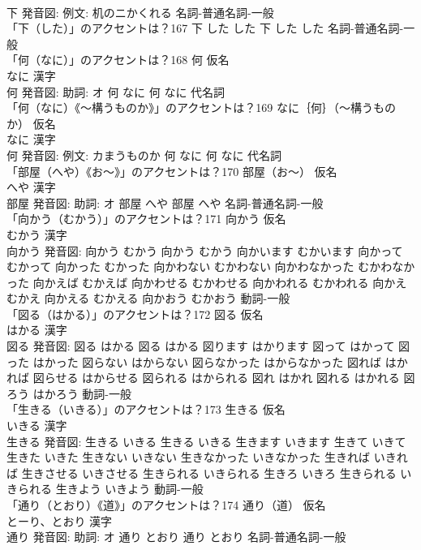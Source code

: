 \documentclass[8pt]{extreport}
\begin{document}
\begin{CJK}{UTF8}{min}
\\	下 発音図: 例文: 机のニかくれる							名詞-普通名詞-一般 
\\	「下（した）」のアクセントは？167		下 した した		下 した した				名詞-普通名詞-一般 
\\	「何（なに）」のアクセントは？168	何 仮名　
\\	なに 漢字　
\\	何 発音図: 助詞: オ	何 なに		何 なに				代名詞 
\\	「何（なに）《〜構うものか》」のアクセントは？169	なに｛何｝（〜構うものか） 仮名　
\\	なに 漢字　
\\	何 発音図: 例文: カまうものか	何 なに		何 なに				代名詞 
\\	「部屋（へや）《お〜》」のアクセントは？170	部屋（お〜） 仮名　
\\	へや 漢字　
\\	部屋 発音図: 助詞: オ	部屋 へや		部屋 へや				名詞-普通名詞-一般 
\\	「向かう（むかう）」のアクセントは？171	向かう 仮名　
\\	むかう 漢字　
\\	向かう 発音図:	向かう むかう		向かう むかう 向かいます むかいます 向かって むかって 向かった むかった 向かわない むかわない 向かわなかった むかわなかった 向かえば むかえば 向かわせる むかわせる 向かわれる むかわれる 向かえ むかえ 向かえる むかえる 向かおう むかおう				動詞-一般 
\\	「図る（はかる）」のアクセントは？172	図る 仮名　
\\	はかる 漢字　
\\	図る 発音図:	図る はかる		図る はかる 図ります はかります 図って はかって 図った はかった 図らない はからない 図らなかった はからなかった 図れば はかれば 図らせる はからせる 図られる はかられる 図れ はかれ 図れる はかれる 図ろう はかろう				動詞-一般 
\\	「生きる（いきる）」のアクセントは？173	生きる 仮名　
\\	いきる 漢字　
\\	生きる 発音図:	生きる いきる		生きる いきる 生きます いきます 生きて いきて 生きた いきた 生きない いきない 生きなかった いきなかった 生きれば いきれば 生きさせる いきさせる 生きられる いきられる 生きろ いきろ 生きられる いきられる 生きよう いきよう				動詞-一般 
\\	「通り（とおり）《道》」のアクセントは？174	通り（道） 仮名　
\\	とーり、とおり 漢字　
\\	通り 発音図: 助詞: オ	通り とおり		通り とおり				名詞-普通名詞-一般 

\end{CJK}
\end{document}
